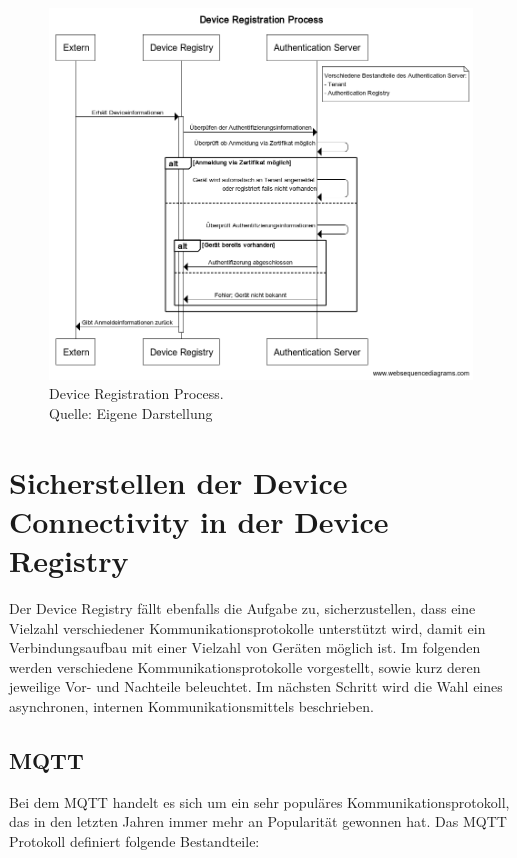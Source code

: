 \begin{figure}
    \centering
    \includegraphics[width=0.8\linewidth]{img/device_registration.png}
    \caption[Device Registration Process]{Device Registration Process.\\Quelle: Eigene Darstellung}
    \label{fig:dev_reg_proc}
\end{figure}

\section{Sicherstellen der Device Connectivity in der Device Registry}

Der Device Registry fällt ebenfalls die Aufgabe zu, sicherzustellen, dass eine Vielzahl verschiedener Kommunikationsprotokolle unterstützt wird, damit ein Verbindungsaufbau mit einer Vielzahl von Geräten möglich ist. Im folgenden werden verschiedene Kommunikationsprotokolle vorgestellt, sowie kurz deren jeweilige Vor- und Nachteile beleuchtet. Im nächsten Schritt wird die Wahl eines asynchronen, internen Kommunikationsmittels beschrieben.

\subsection{MQTT}
Bei dem \ac{MQTT} handelt es sich um ein sehr populäres Kommunikationsprotokoll, das in den letzten Jahren immer mehr an Popularität gewonnen hat. Das \ac{MQTT} Protokoll definiert folgende Bestandteile:

